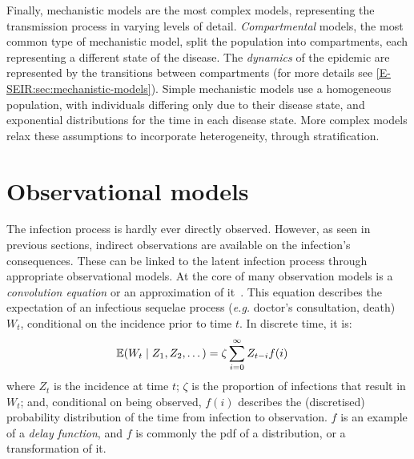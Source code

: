 \documentclass[thesis.tex]{subfiles}
\begin{document}
Finally, mechanistic models are the most complex models, representing the transmission process in varying levels of detail.
\emph{Compartmental} models, the most common type of mechanistic model, split the population into compartments, each representing a different state of the disease.
The \emph{dynamics} of the epidemic are represented by the transitions between compartments (for more details see \cref{E-SEIR:sec:mechanistic-models}).
Simple mechanistic models use a homogeneous population, with individuals differing only due to their disease state, and exponential distributions for the time in each disease state.
More complex models relax these assumptions to incorporate heterogeneity, \eg through stratification.

\section{Observational models} \label{intro:sec:disease-model}

The infection process is hardly ever directly observed.
However, as seen in previous sections, indirect observations are available on the infection's consequences.
These can be linked to the latent infection process through appropriate observational models.
At the core of many observation models is a \emph{convolution equation} or an approximation of it~\autocite[e.g.][]{brookmeyerBackcalculation,abbottEstimating,birrellRealtimea}.
This equation describes the expectation of an infectious sequelae process ({\it e.g.} doctor's consultation, death) $W_t$, conditional on the incidence prior to time $t$.
In discrete time, it is:
\begin{align}
    \operatorname{\mathbb{E}}(W_t \mid Z_1, Z_2, \dots) &= \zeta \sum_{i=0}^\infty Z_{t-i} f(i)
    \label{intro:eq:disease-model}
\end{align}
where $Z_t$ is the incidence at time $t$; $\zeta$ is the proportion of infections that result in $W_t$; and, conditional on being observed, $f(i)$ describes the (discretised) probability distribution of the time from infection to observation.
$f$ is an example of a \emph{delay function}, and  
$f$ is commonly the pdf of a distribution, or a transformation of it.
\end{document}
